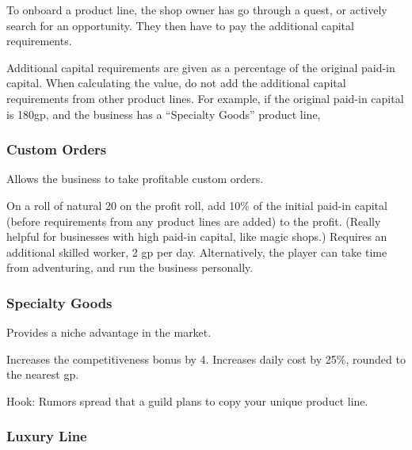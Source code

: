 \documentclass[twocolumn]{dndbook}
\begin{document}
To onboard a product line, the shop owner has go through a quest, or
actively search for an opportunity. They then have to pay the
additional capital requirements.\par

Additional capital requirements are given as a percentage of the original paid-in capital.
When calculating the value, do not add the additional capital requirements from other product lines.
For example, if the original paid-in capital is 180gp, and the business has a ``Specialty Goods'' product line,

\subsubsection{Custom Orders}

Allows the business to take profitable custom orders.

\begin{DndComment}[color=bgtan2018]{}
	On a roll of natural 20 on the profit roll, add 10\% of the initial paid-in capital (before requirements from any product lines are added) to the profit.
	(Really helpful for businesses with high paid-in capital, like magic shops.)
	Requires an additional skilled worker, 2 gp per day.
	Alternatively, the player can take time from adventuring, and run the business personally.
\end{DndComment}



\subsubsection{Specialty Goods}

Provides a niche advantage in the market.

\begin{DndComment}[color=bgtan2018]{}
	Increases the competitiveness bonus by 4.
	Increases daily cost by 25\%, rounded to the nearest gp.
\end{DndComment}

Hook: Rumors spread that a guild plans to copy your unique product line.\par


\subsubsection{Luxury Line}
\end{document}
